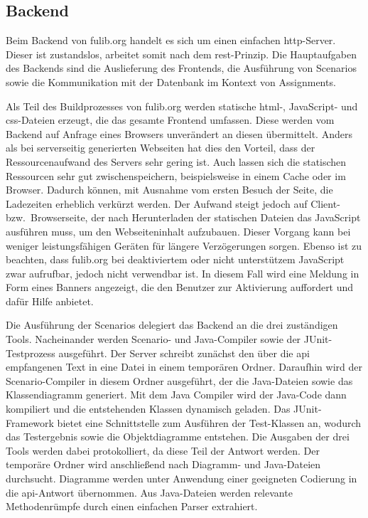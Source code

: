 \subsection{Backend}\label{subsec:backend}

Beim Backend von fulib.org handelt es sich um einen einfachen \ac{http}-Server.
Dieser ist zustandslos, arbeitet somit nach dem \ac{rest}-Prinzip.
Die Hauptaufgaben des Backends sind die Auslieferung des Frontends, die Ausführung von Scenarios sowie die Kommunikation mit der Datenbank im Kontext von Assignments.

Als Teil des Buildprozesses von fulib.org werden statische \ac{html}-, JavaScript- und \ac{css}-Dateien erzeugt, die das gesamte Frontend umfassen.
Diese werden vom Backend auf Anfrage eines Browsers unverändert an diesen übermittelt.
Anders als bei serverseitig generierten Webseiten hat dies den Vorteil, dass der Ressourcenaufwand des Servers sehr gering ist.
Auch lassen sich die statischen Ressourcen sehr gut zwischenspeichern, beispielsweise in einem Cache oder im Browser.
Dadurch können, mit Ausnahme vom ersten Besuch der Seite, die Ladezeiten erheblich verkürzt werden.
Der Aufwand steigt jedoch auf Client- bzw.\ Browserseite, der nach Herunterladen der statischen Dateien das JavaScript ausführen muss, um den Webseiteninhalt aufzubauen.
Dieser Vorgang kann bei weniger leistungsfähigen Geräten für längere Verzögerungen sorgen.
Ebenso ist zu beachten, dass fulib.org bei deaktiviertem oder nicht unterstützem JavaScript zwar aufrufbar, jedoch nicht verwendbar ist.
In diesem Fall wird eine Meldung in Form eines Banners angezeigt, die den Benutzer zur Aktivierung auffordert und dafür Hilfe anbietet.

Die Ausführung der Scenarios delegiert das Backend an die drei zuständigen Tools.
Nacheinander werden Scenario- und Java-Compiler sowie der JUnit-Testprozess ausgeführt.
Der Server schreibt zunächst den über die \ac{api} empfangenen Text in eine Datei in einem temporären Ordner.
Daraufhin wird der Scenario-Compiler in diesem Ordner ausgeführt, der die Java-Dateien sowie das Klassendiagramm generiert.
Mit dem Java Compiler wird der Java-Code dann kompiliert und die entstehenden Klassen dynamisch geladen.
Das JUnit-Framework bietet eine Schnittstelle zum Ausführen der Test-Klassen an, wodurch das Testergebnis sowie die Objektdiagramme entstehen.
Die Ausgaben der drei Tools werden dabei protokolliert, da diese Teil der Antwort werden.
Der temporäre Ordner wird anschließend nach Diagramm- und Java-Dateien durchsucht.
Diagramme werden unter Anwendung einer geeigneten Codierung in die \ac{api}-Antwort übernommen.
Aus Java-Dateien werden relevante Methodenrümpfe durch einen einfachen Parser extrahiert.

